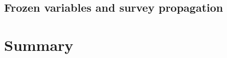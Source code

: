 \documentclass[letterpaper, 10pt, twocolumn, reqno]{amsart}
\begin{document}
\subsection{Frozen variables and survey propagation}
\label{ssec:frozen_variables}


\section{Summary}
\label{sec:summary}


{
\small


}
\end{document}
